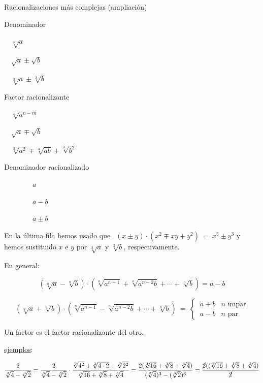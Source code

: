 \begin{myalertblock}{ Racionalizaciones más complejas (ampliación)}
	
\begin{multicols}{3}
Denominador

$\quad \sqrt[n]{a}$

$\quad \sqrt{a} \pm \sqrt{b}$

$\quad \sqrt[3]{a} \pm \sqrt[3]{b}$

Factor racionalizante

$\quad \sqrt[n]{a^{n-m}}$ 

$\quad \sqrt{a} \mp \sqrt{b}$

$\quad \sqrt[3]{a^2} \mp \sqrt[3]{ab} + \sqrt[3]{b^2}$

Denominador racionalizado

$\qquad \qquad a$

$\qquad \qquad a-b$

$\qquad \qquad a\pm b$
	
\end{multicols}




\textcolor{gris}{En la última fila hemos usado que $\ \ (x\pm y)\cdot(x^2\mp xy+y^2) \ = \ x^3\pm y^3$ y hemos sustituido $x$ e $y $ por $\sqrt[3]{a}$ y  $\sqrt[3]{b}$, respectivamente.}

\vspace{2mm} En general:

$$(\sqrt[n]{a}-\sqrt[n]{b})\cdot (\sqrt[n]{a^{n-1}}+\sqrt[n]{a^{n-2}b}+\cdots + \sqrt[n]{b})=a-b $$

$$(\sqrt[n]{a}+\sqrt[n]{b})\cdot (\sqrt[n]{a^{n-1}}-\sqrt[n]{a^{n-2}b}+\cdots + \sqrt[n]{b}) \ = \ \begin{cases}\  a+b& n \text{ impar} \\ \  a-b& n \text{ par} \end{cases}$$

Un factor es el factor racionalizante del otro.

\vspace{2mm}\underline{ejemplos}: 

\vspace{2mm} \begin{small}$\dfrac{2}{\sqrt[3]{4}-\sqrt[3]{2}}=\dfrac{2}{\sqrt[3]{4}-\sqrt[3]{2}}\cdot \dfrac{\sqrt[3]{4^2}+\sqrt[3]{4\cdot 2}+\sqrt[3]{2^2}}{\sqrt[3]{16}+\sqrt[3]{8}+\sqrt[3]{4}}=\dfrac{2(\sqrt[3]{16}+\sqrt[3]{8}+\sqrt[3]{4})}{(\sqrt[3]{4})^3-(\sqrt[3]{2})^3}=\dfrac{\cancel{2} ((\sqrt[3]{16}+\sqrt[3]{8}+\sqrt[3]{4})}{\cancel{2}}$\end{small}





\end{myalertblock}
